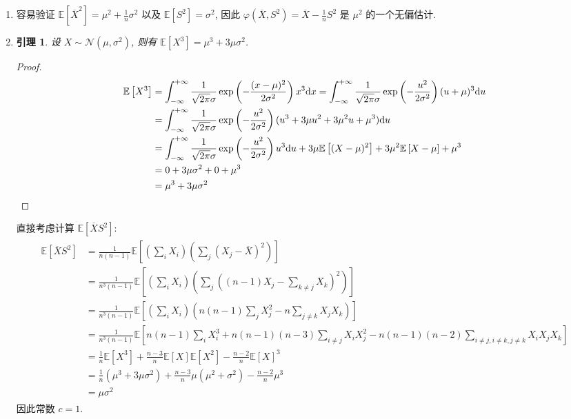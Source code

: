 \documentclass[8pt]{article}
\theoremstyle{compact}
\newtheorem{lemma}{引理}
\def\E#1{\mathbb{E}\left[{#1}\right]}
\begin{document}
\section{}
\begin{enumerate}
	\item 容易验证 $\E{\overline{X}^2} = \mu^2 + \frac1n \sigma^2$ 以及 $\E{S^2} = \sigma^2$, 因此 $\varphi(\overline{X}, S^2) = \overline{X} - \frac1n S^2$ 是 $\mu^2$ 的一个无偏估计.
 \item \begin{lemma}
	 设 $X \sim \mathcal N(\mu, \sigma^2)$, 则有 $\E{X^3} = \mu^3 + 3\mu\sigma^2$.
 \end{lemma}
 \begin{proof}
	 \begin{align*}
		 \begin{split}
			 \E{X^3} &= \int_{-\infty}^{+\infty}\frac{1}{\sqrt{2\pi}\sigma}\exp\left(-\frac{(x-\mu)^2}{2\sigma^2}\right)x^3\text dx = \int_{-\infty}^{+\infty}\frac{1}{\sqrt{2\pi}\sigma}\exp\left(-\frac{u^2}{2\sigma^2}\right)(u+\mu)^3\text du \\
			 &= \int_{-\infty}^{+\infty}\frac{1}{\sqrt{2\pi}\sigma}\exp\left(-\frac{u^2}{2\sigma^2}\right)(u^3 + 3\mu u^2 + 3\mu^2 u + \mu^3)\text du \\
			 &= \int_{-\infty}^{+\infty}\frac{1}{\sqrt{2\pi}\sigma}\exp\left(-\frac{u^2}{2\sigma^2}\right)u^3\text du + 3\mu\E{(X-\mu)^2} + 3\mu^2\E{X-\mu} + \mu^3\\
			 &= 0 + 3\mu\sigma^2 + 0 + \mu^3\\
			 &= \mu^3 + 3\mu\sigma^2
		 \end{split}
	 \end{align*}
 \end{proof}
 直接考虑计算 $\E{\overline{X}S^2}$: \begin{align*}
	 \begin{split}
		\E{\overline{X}S^2} &= \frac{1}{n(n-1)}\E{\left(\sum_i X_i\right) \left(\sum_j (X_j - \overline{X})^2\right)}\\
		&= \frac{1}{n^3(n-1)}\E{\left(\sum_i X_i\right)\left(\sum_j\left((n-1)X_j - \sum_{k \neq j}X_k\right)^2\right)}\\
		&= \frac{1}{n^3(n-1)}\E{\left(\sum_i X_i\right)\left(n(n-1)\sum_jX_j^2 - n\sum_{j \neq k}X_jX_k\right)}\\
		&= \frac{1}{n^3(n-1)}\E{n(n-1)\sum_i X_i^3 + n(n-1)(n-3)\sum_{i \neq j}X_iX_j^2 - n(n-1)(n-2)\sum_{i \neq j, i \neq k, j \neq k}X_iX_jX_k}\\
		&= \frac1n\E{X^3} + \frac{n-3}{n}\E{X}\E{X^2} - \frac{n-2}{n}\E{X}^3\\
		&= \frac1n(\mu^3 + 3\mu\sigma^2) + \frac{n-3}{n}\mu(\mu^2 + \sigma^2) - \frac{n-2}{n}\mu^3 \\
		&= \mu\sigma^2
	 \end{split}
 \end{align*}
 因此常数 $c = 1$.
\end{enumerate}
\end{document}
